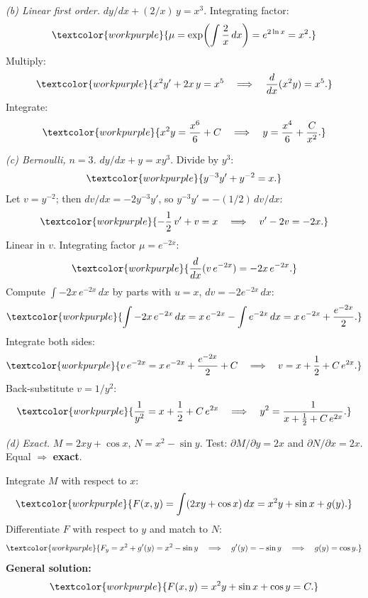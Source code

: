 \medskip

\noindent\textit{(b) Linear first order.}
$dy/dx + (2/x)\,y = x^3$. Integrating factor:
\[
  \textcolor{workpurple}{\mu = \exp\!\left(\int\frac{2}{x}\,dx\right)
  = e^{2\ln x} = x^2.}
\]
Multiply:
\[
  \textcolor{workpurple}{x^2 y' + 2x\,y = x^5
  \quad\Longrightarrow\quad
  \frac{d}{dx}(x^2 y) = x^5.}
\]
Integrate:
\[
  \textcolor{workpurple}{x^2 y = \frac{x^6}{6} + C
  \quad\Longrightarrow\quad
  y = \frac{x^4}{6} + \frac{C}{x^2}.}
\]

\medskip

\noindent\textit{(c) Bernoulli, $n = 3$.}
$dy/dx + y = xy^3$. Divide by $y^3$:
\[
  \textcolor{workpurple}{y^{-3}y' + y^{-2} = x.}
\]
Let $v = y^{-2}$; then $dv/dx = -2y^{-3}y'$, so $y^{-3}y' = -(1/2)\,dv/dx$:
\[
  \textcolor{workpurple}{-\frac{1}{2}\,v' + v = x
  \quad\Longrightarrow\quad
  v' - 2v = -2x.}
\]
Linear in $v$. Integrating factor $\mu = e^{-2x}$:
\[
  \textcolor{workpurple}{\frac{d}{dx}(v\,e^{-2x}) = -2x\,e^{-2x}.}
\]
Compute $\int -2x\,e^{-2x}\,dx$ by parts with $u = x$, $dv = -2e^{-2x}\,dx$:
\[
  \textcolor{workpurple}{\int -2x\,e^{-2x}\,dx
  = x\,e^{-2x} - \int e^{-2x}\,dx
  = x\,e^{-2x} + \frac{e^{-2x}}{2}.}
\]
Integrate both sides:
\[
  \textcolor{workpurple}{v\,e^{-2x} = x\,e^{-2x} + \frac{e^{-2x}}{2} + C
  \quad\Longrightarrow\quad
  v = x + \frac{1}{2} + C\,e^{2x}.}
\]
Back-substitute $v = 1/y^2$:
\[
  \textcolor{workpurple}{\frac{1}{y^2} = x + \frac{1}{2} + C\,e^{2x}
  \quad\Longrightarrow\quad
  y^2 = \frac{1}{x + \tfrac{1}{2} + C\,e^{2x}}.}
\]

\medskip

\noindent\textit{(d) Exact.}
$M = 2xy + \cos x$, $N = x^2 - \sin y$.
Test: $\partial M/\partial y = 2x$ and $\partial N/\partial x = 2x$. Equal
$\Rightarrow$ \textbf{exact}.

Integrate $M$ with respect to $x$:
\[
  \textcolor{workpurple}{F(x,y)
  = \int(2xy + \cos x)\,dx
  = x^2 y + \sin x + g(y).}
\]
Differentiate $F$ with respect to $y$ and match to $N$:
\[
  \textcolor{workpurple}{F_y = x^2 + g'(y) = x^2 - \sin y
  \quad\Longrightarrow\quad
  g'(y) = -\sin y
  \quad\Longrightarrow\quad
  g(y) = \cos y.}
\]
\textbf{General solution:}
\[
  \textcolor{workpurple}{F(x,y) = x^2 y + \sin x + \cos y = C.}
\]

\vspace{0.8em}

